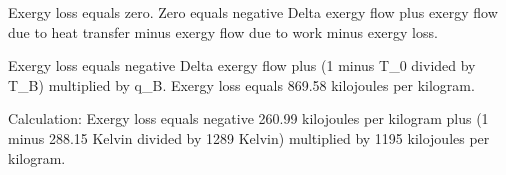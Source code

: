 Exergy loss equals zero.  
Zero equals negative Delta exergy flow plus exergy flow due to heat transfer minus exergy flow due to work minus exergy loss.  

Exergy loss equals negative Delta exergy flow plus (1 minus T_0 divided by T_B) multiplied by q_B.  
Exergy loss equals 869.58 kilojoules per kilogram.  

Calculation:  
Exergy loss equals negative 260.99 kilojoules per kilogram plus (1 minus 288.15 Kelvin divided by 1289 Kelvin) multiplied by 1195 kilojoules per kilogram.